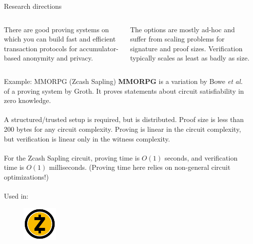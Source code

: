 \documentclass[aspectratio=169]{beamer}
\begin{document}
\begin{frame}{Research directions}
\begin{figure}
\end{figure}
\begin{columns}
\begin{column}{0.5\textwidth}
There are good proving systems on which you can build fast and efficient transaction protocols for accumulator-based anonymity and privacy.
\end{column}
\begin{column}{0.5\textwidth}
The options are mostly ad-hoc and suffer from scaling problems for signature and proof sizes. Verification typically scales as least as badly as size.
\end{column}
\end{columns}
\end{frame}


\begin{frame}{Example: MMORPG (Zcash Sapling)}
\textbf{MMORPG} is a variation by Bowe \textit{et al.} of a proving system by Groth. It proves statements about circuit satisfiability in zero knowledge. \\~\\

A structured/trusted setup is required, but is distributed. Proof size is less than 200 bytes for any circuit complexity. Proving is linear in the circuit complexity, but verification is linear only in the witness complexity. \\~\\

For the Zcash Sapling circuit, proving time is $O(1)$ seconds, and verification time is $O(1)$ milliseconds. (Proving time here relies on non-general circuit optimizations!) \\~\\

Used in:
\begin{figure}
\includegraphics[height=50pt]{zcash.png}
\end{figure}
\end{frame}
\end{document}
